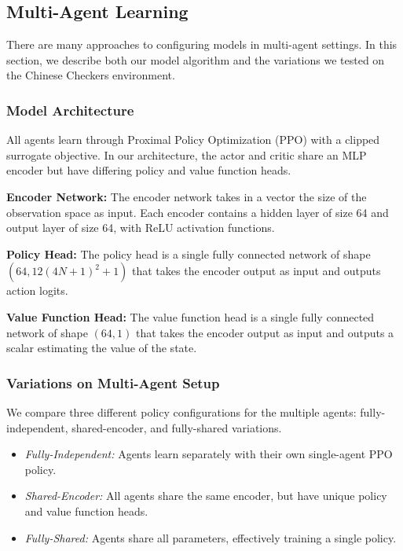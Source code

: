\documentclass[12pt, a4paper, twocolumn]{article}
\begin{document}
\subsection{Multi-Agent Learning}

There are many approaches to configuring models in multi-agent settings. In this section, we describe both our model algorithm and the variations we tested on the Chinese Checkers environment.

\subsubsection{Model Architecture}

All agents learn through Proximal Policy Optimization (PPO) with a clipped surrogate objective\cite{PPO}. In our architecture, the actor and critic share an MLP encoder but have differing policy and value function heads.

\textbf{Encoder Network:} The encoder network takes in a vector the size of the observation space as input. Each encoder contains a hidden layer of size 64 and output layer of size 64, with ReLU activation functions.

\textbf{Policy Head:} The policy head is a single fully connected network of shape $(64, 12(4N + 1)^2 + 1)$ that takes the encoder output as input and outputs action logits.

\textbf{Value Function Head:} The value function head is a single fully connected network of shape $(64, 1)$ that takes the encoder output as input and outputs a scalar estimating the value of the state.

\subsubsection{Variations on Multi-Agent Setup}

We compare three different policy configurations for the multiple agents: fully-independent, shared-encoder, and fully-shared variations.
\begin{itemize}
  \item \textit{Fully-Independent:} Agents learn separately with their own single-agent PPO policy. 
  \item \textit{Shared-Encoder:} All agents share the same encoder, but have unique policy and value function heads.
  \item \textit{Fully-Shared:} Agents share all parameters, effectively training a single policy.
\end{itemize}
\end{document}
